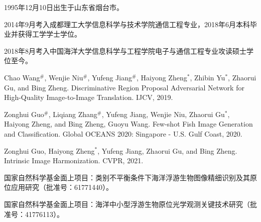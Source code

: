 \begin{resume}


  1995年12月10日出生于山东省烟台市。

  2014年9月考入成都理工大学信息科学与技术学院通信工程专业，2018年6月本科毕业并获得工学学士学位。
  
  2018年8月考入中国海洋大学信息科学与工程学院电子与通信工程专业攻读硕士学位至今。


  \begin{publications}
    \item Chao Wang$^\#$, Wenjie Niu$^\#$, Yufeng Jiang$^\#$, Haiyong Zheng$^\ast$, Zhibin Yu$^\ast$, Zhaorui Gu, and Bing Zheng. Discriminative Region Proposal Adversarial Network for High-Quality Image-to-Image Translation. IJCV, 2019.
  \end{publications}

  \begin{publications} %
    \item Zonghui Guo$^\#$, Liqiang Zhang$^\#$, Yufeng Jiang, Wenjie Niu, Zhaorui Gu$^\ast$, Haiyong Zheng, and Bing Zheng, Guoyu Wang. Few-shot Fish Image Generation and Classification. Global OCEANS 2020: Singapore - U.S. Gulf Coast, 2020.
  \end{publications}
  \begin{publications} 
    \item Zonghui Guo, Haiyong Zheng$^\ast$, Yufeng Jiang, Zhaorui Gu, and Bing Zheng. Intrinsic Image Harmonization. CVPR, 2021.
  \end{publications}

  \begin{achievements}
    \item 国家自然科学基金面上项目：类别不平衡条件下海洋浮游生物图像精细识别及其原位应用研究（批准号：61771440）。
  \end{achievements}
    \begin{achievements}
    \item 国家自然科学基金面上项目：海洋中小型浮游生物原位光学观测关键技术研究（批准号：41776113）。
  \end{achievements}

\end{resume}

